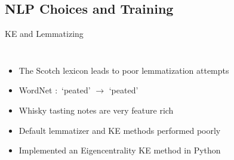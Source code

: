 \documentclass{beamer}
\begin{document}
\subsection{NLP Choices and Training}
\begin{frame}{KE and Lemmatizing}
\begin{columns}[c] %
\begin{itemize}
    \item The Scotch lexicon leads to poor lemmatization attempts
    \item WordNet $:$ `peated' $\rightarrow$ `peated'
    \item Whisky tasting notes are very feature rich
    \item Default lemmatizer and KE methods performed poorly
    \item Implemented an Eigencentrality KE method in Python
\end{itemize}
        

\end{columns}
\end{frame}
\end{document}
